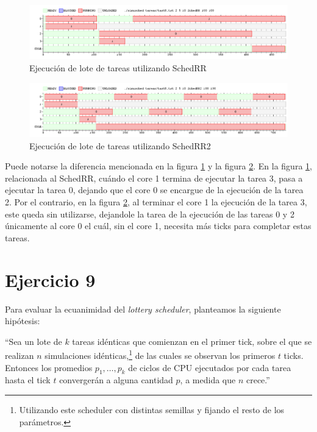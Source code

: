 \documentclass[a4paper,10pt,twoside]{article}
\begin{document}
\begin{figure}[ht!]
\centering
\includegraphics[width=175mm]{../ejercicio8/schedRRej8.png}
\caption{Ejecución de lote de tareas utilizando SchedRR}
\label{schedRRej8}
\end{figure}

\begin{figure}[ht!]
\centering
\includegraphics[width=175mm]{../ejercicio8/schedRR2ej8.png}
\caption{Ejecución de lote de tareas utilizando SchedRR2}
\label{schedRR2ej8}
\end{figure}

Puede notarse la diferencia mencionada en la figura \ref{schedRRej8} y la figura \ref{schedRR2ej8}. En la figura \ref{schedRRej8}, relacionada al SchedRR, cuándo el core 1 termina de ejecutar la tarea 3, pasa a ejecutar la tarea 0, dejando que el core 0 se encargue de la ejecución de la tarea 2. Por el contrario, en la figura \ref{schedRR2ej8}, al terminar el core 1 la ejecución de la tarea 3, este queda sin utilizarse, dejandole la tarea de la ejecución de las tareas 0 y 2 únicamente al core 0 el cuál, sin el core 1, necesita más ticks para completar estas tareas.



\section{Ejercicio 9}

Para evaluar la ecuanimidad del \textit{lottery scheduler}, planteamos la siguiente hipótesis:

``Sea un lote de $k$ tareas idénticas que comienzan en el primer tick, sobre el que se realizan $n$ simulaciones idénticas,\footnote{Utilizando este scheduler con distintas semillas y fijando el resto de los parámetros.} de las cuales se observan los primeros $t$ ticks. Entonces los promedios $p_1, \ldots, p_k$ de ciclos de CPU ejecutados por cada tarea hasta el tick $t$ convergerán a alguna cantidad $p$, a medida que $n$ crece.''
\end{document}
